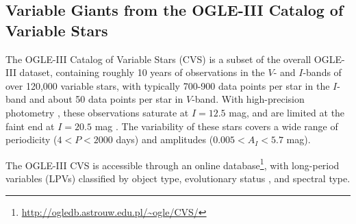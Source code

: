 
\subsection{Variable Giants from the OGLE-III Catalog of Variable Stars}\label{sec:ogle}
The OGLE-III Catalog of Variable Stars (CVS) \citep{2008AcA....58...69U,2009AcA....59..239S,2011AcA....61..217S} is a subset of the overall OGLE-III dataset, containing roughly 10 years of observations in the $V$- and $I$-bands of over 120,000 variable stars, with typically 700-900 data points per star in the $I$-band and about 50 data points per star in $V$-band. With high-precision photometry \citep[$\sim0.01$ mag,][]{2007AcA....57..201S}, these observations saturate at $I = 12.5$ mag, and are limited at the faint end at $I = 20.5$ mag \citep{2001AcA....51..303Z}. The variability of these stars covers a wide range of periodicity ($4 < P < 2000$ days) and amplitudes ($0.005 < A_I < 5.7$ mag).

The OGLE-III CVS is accessible through an online database\footnote{\url{http://ogledb.astrouw.edu.pl/~ogle/CVS/}}, with long-period variables (LPVs) classified by object type, evolutionary status , and spectral type. 
